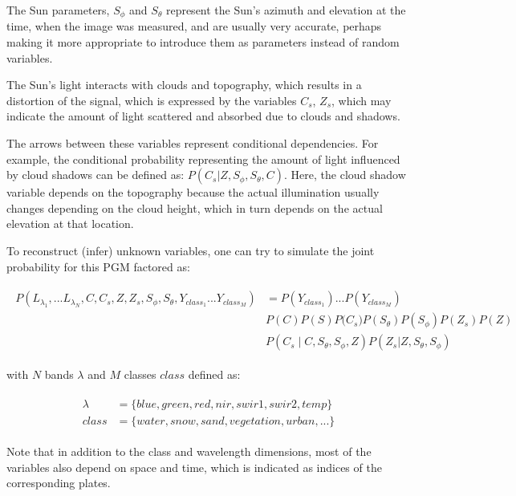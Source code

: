 The Sun parameters, $S_\phi$ and $S_\theta$ represent the Sun's azimuth and elevation at the time, when the image was measured, and are usually very accurate, perhaps making it more appropriate to introduce them as parameters instead of random variables.

The Sun's light interacts with clouds and topography, which results in a distortion of the signal, which is expressed by the variables $C_s$, $Z_s$, which may indicate the amount of light scattered and absorbed due to clouds and shadows.

The arrows between these variables represent conditional dependencies. For example, the conditional probability representing the amount of light influenced by cloud shadows can be defined as: $P(C_s|Z,S_\phi,S_\theta,C)$. Here, the cloud shadow variable depends on the topography because the actual illumination usually changes depending on the cloud height, which in turn depends on the actual elevation at that location.

To reconstruct (infer) unknown variables, one can try to simulate the joint probability for this PGM factored as:

\begin{equation}
\begin{split}
\begin{aligned}
P{(L_{\lambda_1}, ... L_{\lambda_N}, C, C_s, Z, Z_s, S_\phi, S_\theta, Y_{class_1} ... Y_{class_M})} &= P(Y_{class_1}) ... P(Y_{class_M}) \\
& P{(C)} P{(S)} P({C_s)} P{(S_\theta)} P{(S_\phi)}  P{(Z_s)} P{(Z)} \\ 
& P{(C_s \mid C,S_\theta,S_\phi,Z)}  P{(Z_s|Z,S_\theta, S_\phi)}
\end{aligned}
\end{split}
\label{eq:bn-joint}
\end{equation}

with $N$ bands $\lambda$ and $M$ classes $class$ defined as:

\begin{equation}
\begin{split}
\begin{aligned}
\lambda &= \{blue, green, red, nir, swir1, swir2, temp\} \\
class &= \{water, snow, sand, vegetation, urban, ...\}
\end{aligned}
\end{split}
\end{equation}

Note that in addition to the class and wavelength dimensions, most of the variables also depend on space and time, which is indicated as indices of the corresponding plates. 

